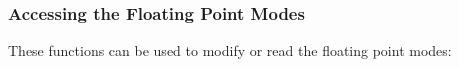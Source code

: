 \subsubsection{Accessing the Floating Point Modes}

These functions can be used to modify or read the floating point modes:

